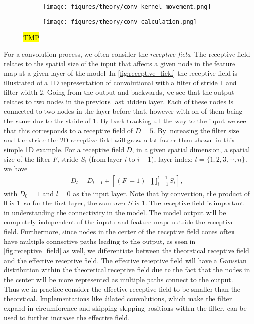 \begin{figure}[H]
  \centering
  \begin{subfigure}[t]{0.26\textwidth}
      \centering
      \texttt{[image: figures/theory/conv\_kernel\_movement.png]}
      \caption{}
  \end{subfigure}
  \hfill
  \begin{subfigure}[t]{0.70\textwidth}
      \centering
      \texttt{[image: figures/theory/conv\_calculation.png]}
      \caption{}
  \end{subfigure}
  \hfill
  \caption{\hl{TMP}}
  \label{fig:conv_example}
\end{figure}

For a convolution process, we often consider the \textit{receptive field}. The
receptive field relates to the spatial size of the input that affects a given
node in the feature map at a given layer of the model. In
\cref{fig:receptive_field} the receptive field is illustrated of a 1D
representation of convolutional with a filter of stride 1 and filter width 2.
Going from the output and backwards, we see that the output relates to two nodes
in the previous last hidden layer. Each of these nodes is connected to two nodes
in the layer before that, however with on of them being the same due to the
stride of 1. By back tracking all the way to the input we see that this
corresponds to a receptive field of $D = 5$. By increasing the filter size and
the stride the 2D receptive field will grow a lot faster than shown in this
simple 1D example. For a receptive field $D$, in a given spatial dimension, a
spatial size of the filter $F$, stride $S_i$ (from layer $i$ to $i-1$), layer
index: $l = \{1,2,3,\cdots,n\}$, we have
\begin{align*}
    D_l = D_{l-1} + \left[(F_l - 1) \cdot \prod_{i=1}^{l-1}S_i \right],
\end{align*}
with $D_0 = 1$ and $l=0$ as the input layer. Note that by convention, the
product of 0 is 1, so for the first layer, the sum over $S$ is 1. The receptive
field is important in understanding the connectivity in the model. The model
output will be completely independent of the inputs and feature maps outside the
receptive field. Furthermore, since nodes in the center of the receptive field
cones often have multiple connective paths leading to the output, as seen in
\cref{fig:receptive_field} as well, we differentiate between the theoretical
receptive field and the effective receptive field. The effective receptive field
will have a Gaussian distribution within the theoretical receptive field due to
the fact that the nodes in the center will be more represented as multiple paths
connect to the output. Thus we in practice consider the effective receptive
field to be smaller than the theoretical. Implementations like dilated
convolutions, which make the filter expand in circumforence and skipping
skipping positions within the filter, can be used to further increase the
effective field. 

